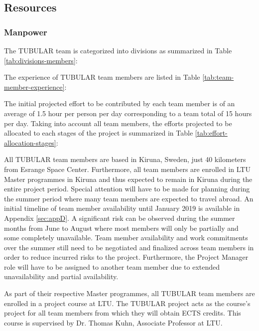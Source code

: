 \subsection{Resources}

\subsubsection{Manpower}
The TUBULAR team is categorized into divisions as summarized in Table \ref{tab:divisions-members}:



The experience of TUBULAR team members are listed in Table \ref{tab:team-member-experience}:



The initial projected effort to be contributed by each team member is of an average of 1.5 hour per person per day corresponding to a team total of 15 hours per day. Taking into account all team members, the efforts projected to be allocated to each stages of the project is summarized in Table \ref{tab:effort-allocation-stages}:



All TUBULAR team members are based in Kiruna, Sweden, just 40 kilometers from Esrange Space Center. Furthermore, all team members are enrolled in LTU Master programmes in Kiruna and thus expected to remain in Kiruna during the entire project period. Special attention will have to be made for planning during the summer period where many team members are expected to travel abroad. An initial timeline of team member availability  until January 2019 is available in Appendix \ref{sec:appD}. A significant risk can be observed during the summer months from June to August where most members will only be partially and some completely unavailable. Team member availability and work commitments over the summer still need to be negotiated and finalized across team members in order to reduce incurred risks to the project. Furthermore, the Project Manager role will have to be assigned to another team member due to extended unavailability and partial availability.

As part of their respective Master programmes, all TUBULAR team members are enrolled in a project course at LTU. The TUBULAR project acts as the course's project for all team members from which they will obtain ECTS credits. This course is supervised by Dr. Thomas Kuhn, Associate Professor at LTU.

